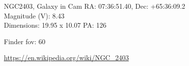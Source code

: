 \begin{block}{NGC2403, Galaxy in Cam}
    RA: 07:36:51.40, Dec: +65:36:09.2 \\ 
    Magnitude (V): 8.43 \\ 
    Dimensions: 19.95 x 10.07 PA: 126 

    Finder fov: 60 

    \url{https://en.wikipedia.org/wiki/NGC_2403} 
\end{block}